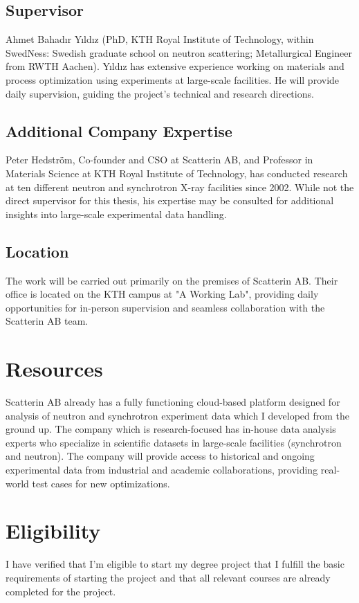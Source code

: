 \documentclass{article}
\begin{document}
\subsection{Supervisor}
Ahmet Bahadır Yıldız (PhD, KTH Royal Institute of Technology, within SwedNess: Swedish graduate school on neutron scattering; Metallurgical Engineer from RWTH Aachen). Yıldız has extensive experience working on materials and process optimization using experiments at large-scale facilities. He will provide daily supervision, guiding the project’s technical and research directions.

\subsection{Additional Company Expertise}
Peter Hedström, Co-founder and CSO at Scatterin AB, and Professor in Materials Science at KTH Royal Institute of Technology, has conducted research at ten different neutron and synchrotron X-ray facilities since 2002. While not the direct supervisor for this thesis, his expertise may be consulted for additional insights into large-scale experimental data handling.

\subsection{Location}
The work will be carried out primarily on the premises of Scatterin AB. Their office is located on the KTH campus at "A Working Lab", providing daily opportunities for in-person supervision and seamless collaboration with the Scatterin AB team.

\section{Resources}
Scatterin AB already has a fully functioning cloud-based platform designed for analysis of neutron and synchrotron experiment data which I developed from the ground up. The company which is research-focused has in-house data analysis experts who specialize in scientific datasets in large-scale facilities (synchrotron and neutron). The company will provide access to historical and ongoing experimental data from industrial and academic collaborations, providing real-world test cases for new optimizations.

\section{Eligibility}
I have verified that I'm eligible to start my degree project that I fulfill the basic requirements of starting the project and that all relevant courses are already completed for the project.
\end{document}
